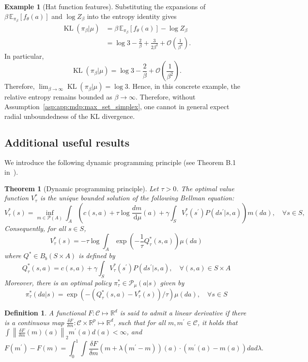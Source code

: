 \documentclass{amsart}
\newtheorem{theorem}{Theorem}
\newtheorem{definition}{Definition}
\theoremstyle{definition}
\newtheorem{example}{Example}
\begin{document}
\begin{example}[Hat function features]
Substituting the expansions of $\beta\,\mathbb E_{\pi_\beta}[f_\theta(a)]$ and $\log Z_\beta$ into the entropy identity gives
\[
\begin{aligned}
\operatorname{KL}(\pi_\beta| \mu)
&=
\beta\,\mathbb E_{\pi_\beta}[f_\theta(a)]
-
\log Z_\beta \\[0.4em]
&=
\log 3
-
\frac{2}{\beta}
+
\frac{3}{2\beta^2}
+
\mathcal O\!\left(\frac1{\beta^3}\right).
\end{aligned}
\]
In particular,
\[
\operatorname{KL}(\pi_\beta| \mu)
=
\log 3
-
\frac{2}{\beta}
+
\mathcal O\!\left(\frac1{\beta^2}\right).
\]
Therefore, $\lim_{\beta\to\infty}\operatorname{KL}(\pi_\beta| \mu)=\log 3$.
Hence, in this concrete example, the relative entropy remains bounded as $\beta\to\infty$. Therefore, without Assumption~\ref{asp:app:mdp:max_set_simplex}, one cannot in general expect radial unboundedness of the KL divergence.
\end{example}

\subsection{Additional useful results}
\label{sec:extra results}

We introduce the following dynamic programming principle (see Theorem B.1 in~\cite{kerimkulov2025fisher}).
\begin{theorem}[Dynamic programming principle]\label{thm:app:dpp}
Let $\tau>0$. The optimal value function $V_\tau^*$ is the unique bounded solution of the following Bellman equation:
\[
V_\tau^*(s)=\inf _{m \in \mathcal{P}(A)} \int_A\left(c(s, a)+\tau \log \frac{d m}{\mathrm{~d} \mu}(a)+\gamma \int_S V_\tau^*\left(s^{\prime}\right) P\left(d s^{\prime} | s, a\right)\right) m(d a), \quad \forall s \in S,
\]
Consequently, for all $s \in S$,
\[
V_\tau^*(s)=-\tau \log \int_A \exp \left(-\frac{1}{\tau} Q_\tau^*(s, a)\right) \mu(d a)
\]
where $Q^* \in B_b(S \times A)$ is defined by
\[
Q_\tau^*(s, a)=c(s, a)+\gamma \int_S V_\tau^*\left(s^{\prime}\right) P\left(d s^{\prime} | s, a\right), \quad \forall(s, a) \in S \times A
\]
Moreover, there is an optimal policy $\pi_\tau^* \in \mathcal{P}_\mu(a|s)$ given by
\[
\pi_\tau^*(d a|s)=\exp \left(-\left(Q_\tau^*(s, a)-V_\tau^*(s)\right) / \tau\right) \mu(d a), \quad \forall s \in S
\]
\end{theorem}


\begin{definition}\label{def:app:flat_derivative}
A functional $F: \mathcal{C} \mapsto \mathbb{R}^d$ is said to admit a linear derivative if there is a continuous map $\frac{\delta F}{\delta m}: \mathcal{C} \times \mathbb{R}^p \mapsto \mathbb{R}^d$, such that for all $m, m^{\prime} \in \mathcal{C}$, it holds that $\int \left\|\frac{\delta F}{\delta m}( m)(a)\right\|_2 m^{\prime}(a) d(a) < \infty$, and
\begin{equation}\label{eq: flat derivative01 }
F\left(m^{\prime}\right)-F(m)=\int_0^1 \int \frac{\delta F}{\delta m}\left(m+\lambda\left(m^{\prime}-m\right)\right)(a)  \cdot \left(m^{\prime}(a)-m(a)\right)da d \lambda .
\end{equation}
\end{definition}
\end{document}
